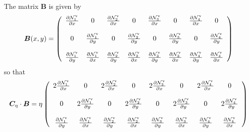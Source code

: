 The matrix ${\bm B}$ is given by 
\[
{\bm B}(x,y)=
\left(
\begin{array}{cccccccccc}
\frac{\partial {\mathcal{N}}_1^\upnu}{\partial x} & 0 & 
\frac{\partial {\mathcal{N}}_2^\upnu}{\partial x} & 0 & 
\frac{\partial {\mathcal{N}}_3^\upnu}{\partial x} & 0 & 
\frac{\partial {\mathcal{N}}_4^\upnu}{\partial x} & 0
\\  \\
0 & \frac{\partial {\mathcal{N}}_1^\upnu}{\partial y} & 
0 & \frac{\partial {\mathcal{N}}_2^\upnu}{\partial y} &
0 & \frac{\partial {\mathcal{N}}_3^\upnu}{\partial y} & 
0 & \frac{\partial {\mathcal{N}}_4^\upnu}{\partial y} 
\\ \\
 \frac{\partial {\mathcal{N}}_1^\upnu}{\partial y} 
&\frac{\partial {\mathcal{N}}_1^\upnu}{\partial x} &  
 \frac{\partial {\mathcal{N}}_2^\upnu}{\partial y} 
&\frac{\partial {\mathcal{N}}_2^\upnu}{\partial x} & 
 \frac{\partial {\mathcal{N}}_3^\upnu}{\partial y} 
&\frac{\partial {\mathcal{N}}_3^\upnu}{\partial x} &   
 \frac{\partial {\mathcal{N}}_4^\upnu}{\partial y} 
&\frac{\partial {\mathcal{N}}_4^\upnu}{\partial x}  
\end{array}
\right) 
\]
so that 
\[
{\bm C}_\eta \cdot {\bm B} 
=
\eta
\left(
\begin{array}{cccccccccc}
2\frac{\partial {\mathcal{N}}_1^\upnu}{\partial x} & 0 & 
2\frac{\partial {\mathcal{N}}_2^\upnu}{\partial x} & 0 & 
2\frac{\partial {\mathcal{N}}_3^\upnu}{\partial x} & 0 & 
2\frac{\partial {\mathcal{N}}_4^\upnu}{\partial x} & 0
\\  \\
0 & 2\frac{\partial {\mathcal{N}}_1^\upnu}{\partial y} & 
0 & 2\frac{\partial {\mathcal{N}}_2^\upnu}{\partial y} &
0 & 2\frac{\partial {\mathcal{N}}_3^\upnu}{\partial y} & 
0 & 2\frac{\partial {\mathcal{N}}_4^\upnu}{\partial y} 
\\ \\
\frac{\partial {\mathcal{N}}_1^\upnu}{\partial y} &  
\frac{\partial {\mathcal{N}}_1^\upnu}{\partial x} &  
\frac{\partial {\mathcal{N}}_2^\upnu}{\partial y} &  
\frac{\partial {\mathcal{N}}_2^\upnu}{\partial x} & 
\frac{\partial {\mathcal{N}}_3^\upnu}{\partial y} &  
\frac{\partial {\mathcal{N}}_3^\upnu}{\partial x} &   
\frac{\partial {\mathcal{N}}_4^\upnu}{\partial y} &  
\frac{\partial {\mathcal{N}}_4^\upnu}{\partial x}  
\end{array}
\right) 
\]

